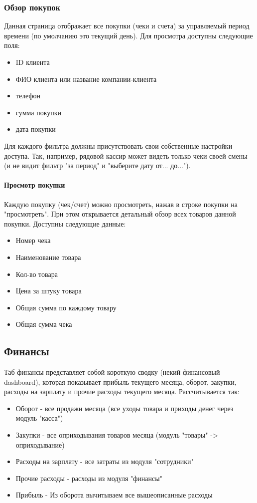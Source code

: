 \documentclass[DIV=calc, paper=a4, fontsize=11pt]{scrartcl} %
\begin{document}
\subsubsection{Обзор покупок}
Данная страница отображает все покупки (чеки и счета) за управляемый период времени (по умолчанию это текущий день). Для просмотра доступны следующие поля:

\begin{itemize}
	\item ID клиента
	\item ФИО клиента или название компании-клиента
	\item телефон
	\item сумма покупки 
	\item дата покупки
\end{itemize}

Для каждого фильтра должны присутствовать свои собственные настройки доступа. Так, например, рядовой кассир может видеть только чеки своей смены (и не видит фильтр "за период" и "выберите дату от... до...").

\paragraph{Просмотр покупки}
Каждую покупку (чек/счет) можно просмотреть, нажав в строке покупки на "просмотреть". При этом открывается детальный обзор всех товаров данной покупки. Доступны следующие данные:

\begin{itemize}
	\item Номер чека
	\item Наименование товара
	\item Кол-во товара
	\item Цена за штуку товара
	\item Общая сумма по каждому товару
	\item Общая сумма чека
\end{itemize}

\subsection{Финансы}

Таб финансы представляет собой короткую сводку (некий финансовый dashboard), которая показывает прибыль текущего месяца, оборот, закупки, расходы на зарплату и прочие расходы текущего месяца. Рассчитывается так:

\begin{itemize}
	\item Оборот - все продажи месяца (все уходы товара и приходы денег через модуль "касса")
	\item Закупки - все оприходывания товаров месяца (модуль "товары" -> оприходывание)
	\item Расходы на зарплату - все затраты из модуля "сотрудники"
	\item Прочие расходы - расходы из модуля "финансы"
	\item Прибыль - Из оборота вычитываем все вышеописанные расходы
\end{itemize}
\end{document}
